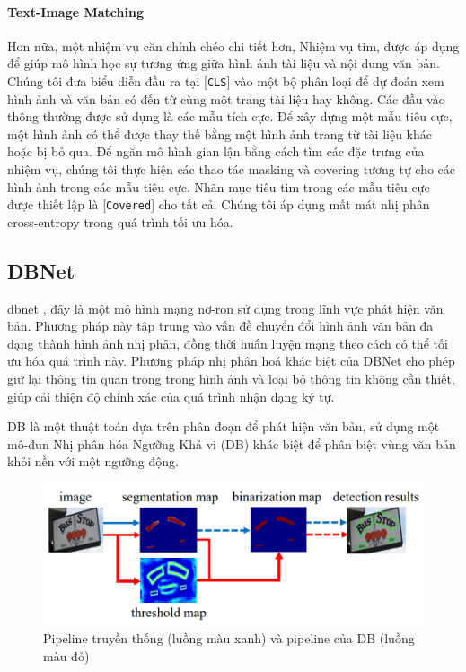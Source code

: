 \paragraph*{Text-Image Matching}
Hơn nữa, một nhiệm vụ căn chỉnh chéo chi tiết hơn, Nhiệm vụ \acrfull*{tim}, được áp dụng để giúp mô hình học sự tương ứng giữa hình ảnh tài liệu và nội dung văn bản. Chúng tôi đưa biểu diễn đầu ra tại [\texttt{CLS}] vào một bộ phân loại để dự đoán xem hình ảnh và văn bản có đến từ cùng một trang tài liệu hay không. Các đầu vào thông thường được sử dụng là các mẫu tích cực. Để xây dựng một mẫu tiêu cực, một hình ảnh có thể được thay thế bằng một hình ảnh trang từ tài liệu khác hoặc bị bỏ qua. Để ngăn mô hình gian lận bằng cách tìm các đặc trưng của nhiệm vụ, chúng tôi thực hiện các thao tác masking và covering tương tự cho các hình ảnh trong các mẫu tiêu cực. Nhãn mục tiêu \acrshort*{tim} trong các mẫu tiêu cực được thiết lập là [\texttt{Covered}] cho tất cả. Chúng tôi áp dụng mất mát nhị phân cross-entropy trong quá trình tối ưu hóa.

\subsection{DBNet}
\acrfull*{dbnet} \cite{liao2019realtime}, đây là một mô hình mạng nơ-ron sử dụng trong lĩnh vực phát hiện văn bản. Phương pháp này tập trung vào vấn đề chuyển đổi hình ảnh văn bản đa dạng thành hình ảnh nhị phân, đồng thời huấn luyện mạng theo cách có thể tối ưu hóa quá trình này. Phương pháp nhị phân hoá khác biệt của DBNet cho phép giữ lại thông tin quan trọng trong hình ảnh và loại bỏ thông tin không cần thiết, giúp cải thiện độ chính xác của quá trình nhận dạng ký tự.

DB là một thuật toán dựa trên phân đoạn để phát hiện văn bản, sử dụng một mô-đun Nhị phân hóa Ngưỡng Khả vi (DB) khác biệt để phân biệt vùng văn bản khỏi nền với một ngưỡng động.

\begin{figure}[h]
    \includegraphics[scale=0.5]{images/tradition-db-pipeline.png}
    \centering
    \caption{Pipeline truyền thống (luồng màu xanh) và pipeline của DB (luồng màu đỏ) }
    \label{}
\end{figure}

